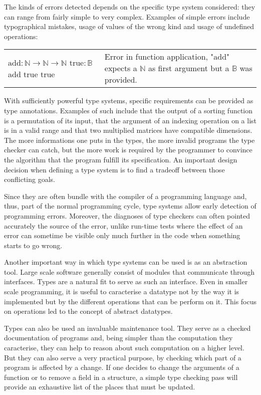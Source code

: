 The kinds of errors detected depends on the specific type system considered: they can range from
fairly simple to very complex. Examples of simple errors include typographical mistakes, usage of
values of the wrong kind and usage of undefined operations:

\begin{center}
  \begin{tabular}{m{3.5cm} | m{5.5cm}}
    $\text{add} : \mathbb{N} \to \mathbb{N} \to \mathbb{N}$ \newline
    $\text{true} : \mathbb{B}$ \newline
    add true true
    & Error in function application, "add" expects a $\mathbb{N}$ as first argument but a
    $\mathbb{B}$ was provided.
  \end{tabular}
\end{center}

With sufficiently powerful type systems, specific requirements can be provided as type annotations.
Examples of such include that the output of a sorting function is a permutation of its input, that
the argument of an indexing operation on a list is in a valid range and that two multiplied matrices
have compatible dimensions. The more informations one puts in the types, the more invalid programs
the type checker can catch, but the more work is required by the programmer to convince the
algorithm that the program fulfill its specification. An important design decision when defining
a type system is to find a tradeoff between those conflicting goals.

Since they are often bundle with the compiler of a programming language and, thus, part of the
normal programming cycle, type systems allow early detection of programming errors. Moreover, the
diagnoses of type checkers can often pointed accurately the source of the error, unlike run-time
tests where the effect of an error can sometime be visible only much further in the code when
something starts to go wrong.

Another important way in which type systems can be used is as an abstraction tool. Large scale
software generally consist of modules that communicate through interfaces. Types are a natural fit
to serve as such an interface. Even in smaller scale programming, it is useful to caracterise a
datatype not by the way it is implemented but by the different operations that can be perform on it.
This focus on operations led to the concept of abstract datatypes.

Types can also be used an invaluable maintenance tool. They serve as a checked documentation of
programs and, being simpler than the computation they caracterise, they can help to reason about
such computation on a higher level. But they can also serve a very practical purpose, by checking
which part of a program is affected by a change. If one decides to change the arguments of a
function or to remove a field in a structure, a simple type checking pass will provide an exhaustive
list of the places that must be updated.

